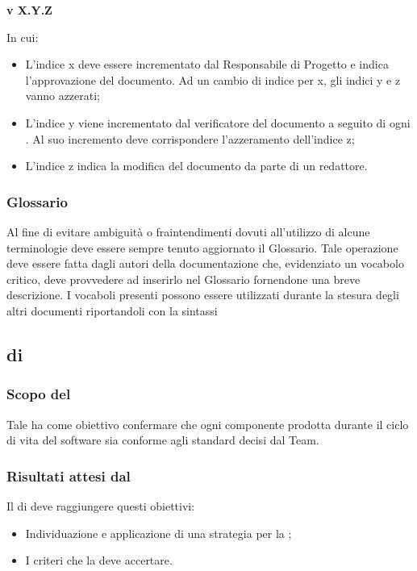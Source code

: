 \begin{center}
  \textbf{v X.Y.Z}
\end{center}

In cui:
\begin{itemize}
\item L'indice x deve essere incrementato dal Responsabile di Progetto e indica l'approvazione del documento. Ad un cambio di indice per x, gli indici y e z vanno azzerati;
\item L'indice y viene incrementato dal verificatore del documento a seguito di ogni . Al suo incremento deve corrispondere l'azzeramento dell'indice z;
\item L'indice z indica la modifica del documento da parte di un redattore.
\end{itemize}

\subsubsection{Glossario}
Al fine di evitare ambiguità o fraintendimenti dovuti all'utilizzo di alcune terminologie deve essere sempre tenuto aggiornato il Glossario. Tale operazione deve essere fatta dagli autori della documentazione che, evidenziato un vocabolo critico, deve provvedere ad inserirlo nel Glossario fornendone una breve descrizione. I vocaboli presenti possono essere utilizzati durante la stesura degli altri documenti riportandoli con la sintassi 

\subsection{ di }
\subsubsection{Scopo del }
Tale  ha come obiettivo confermare che ogni componente prodotta durante il ciclo di vita del software sia conforme agli standard decisi dal Team.
\subsubsection{Risultati attesi dal }
Il  di  deve raggiungere questi obiettivi:
\begin{itemize}
\item Individuazione e applicazione di una strategia per la ;
\item I criteri che la  deve accertare.
\end{itemize}

